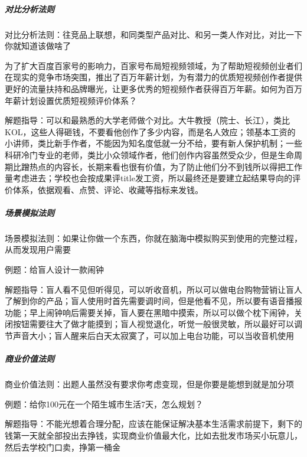 \documentclass[letterpaper,10pt,english]{sphinxmanual}
\begin{document}
\subparagraph{对比分析法则}
\label{\detokenize{chapter_interview/exam:id11}}
对比分析法则：往竞品上联想，和同类型产品对比、和另一类人作对比，对比一下你就知道该做啥了

为了扩大百度百家号的影响力，百家号布局短视频领域，为了帮助短视频创业者们在现实的竞争市场突围，推出了百万年薪计划，为有潜力的优质短视频创作者提供更好的流量扶持和品牌曝光，让更多优秀的短视频作者获得百万年薪。如何为百万年薪计划设置优质短视频评价体系？

解题指导：可以和最熟悉的大学老师做个对比。大牛教授（院士、长江），类比KOL，这些人得砸钱，不要看他创作了多少内容，而是名人效应；领基本工资的小讲师，类比新手作者，不能因为知名度低就一分不给，要有新人保护机制；一些科研冷门专业的老师，类比小众领域作者，他们创作内容虽然受众少，但是生命周期比蹭热点的内容长，长期来看也很有价值，为了防止他们分不到钱所以得把工作量考虑进去；学校也会按成果评title发工资，所以最终还是要建立起结果导向的评价体系，依据观看、点赞、评论、收藏等指标来发钱。


\subparagraph{场景模拟法则}
\label{\detokenize{chapter_interview/exam:id12}}
场景模拟法则：如果让你做一个东西，你就在脑海中模拟购买到使用的完整过程，从而发现用户需要

例题：给盲人设计一款闹钟

解题指导：盲人看不见但听得见，可以听收音机，所以可以做电台购物营销让盲人了解到你的产品；盲人使用时首先需要调时间，但是他看不见，所以要有语音播报功能；早上闹钟响后需要关掉，盲人要在黑暗中摸索，所以可以做个枕下闹钟，关闭按钮需要往大了做才能摸到；盲人视觉退化，听觉一般很灵敏，所以最好可以调节声音大小；盲人醒来后白天太寂寞了，可以加上电台功能，可以当收音机使用


\subparagraph{商业价值法则}
\label{\detokenize{chapter_interview/exam:id13}}
商业价值法则：出题人虽然没有要求你考虑变现，但是你要是能想到就是加分项

例题：给你100元在一个陌生城市生活7天，怎么规划？

解题指导：不能光想着合理分配，应该在能保证解决基本生活需求前提下，剩下的钱第一天就全部投出去挣钱，实现商业价值最大化，比如去批发市场买小玩意儿，然后去学校门口卖，挣第一桶金
\end{document}
